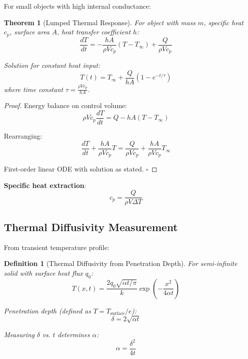 \documentclass[12pt,a4paper]{article}
\newtheorem{theorem}{Theorem}
\newtheorem{definition}{Definition}
\begin{document}
For small objects with high internal conductance:

\begin{theorem}[Lumped Thermal Response]
For object with mass $m$, specific heat $c_p$, surface area $A$, heat transfer coefficient $h$:
\begin{equation}
\frac{dT}{dt} = -\frac{hA}{\rho Vc_p}(T - T_{\infty}) + \frac{Q}{\rho Vc_p}
\end{equation}

Solution for constant heat input:
\begin{equation}
T(t) = T_{\infty} + \frac{Q}{hA}\left(1 - e^{-t/\tau}\right)
\end{equation}
where time constant $\tau = \frac{\rho V c_p}{hA}$.
\end{theorem}

\begin{proof}
Energy balance on control volume:
\begin{equation}
\rho V c_p \frac{dT}{dt} = Q - hA(T - T_{\infty})
\end{equation}

Rearranging:
\begin{equation}
\frac{dT}{dt} + \frac{hA}{\rho Vc_p}T = \frac{Q}{\rho Vc_p} + \frac{hA}{\rho Vc_p}T_{\infty}
\end{equation}

First-order linear ODE with solution as stated. $\square$
\end{proof}

\textbf{Specific heat extraction}:
\begin{equation}
c_p = \frac{Q}{\rho V \Delta T}
\end{equation}

\subsection{Thermal Diffusivity Measurement}

From transient temperature profile:

\begin{definition}[Thermal Diffusivity from Penetration Depth]
For semi-infinite solid with surface heat flux $q_0$:
\begin{equation}
T(x,t) = \frac{2q_0\sqrt{\alpha t/\pi}}{k}\exp\left(-\frac{x^2}{4\alpha t}\right)
\end{equation}

Penetration depth (defined as $T = T_{\text{surface}}/e$):
\begin{equation}
\delta = 2\sqrt{\alpha t}
\end{equation}

Measuring $\delta$ vs. $t$ determines $\alpha$:
\begin{equation}
\alpha = \frac{\delta^2}{4t}
\end{equation}
\end{definition}
\end{document}
